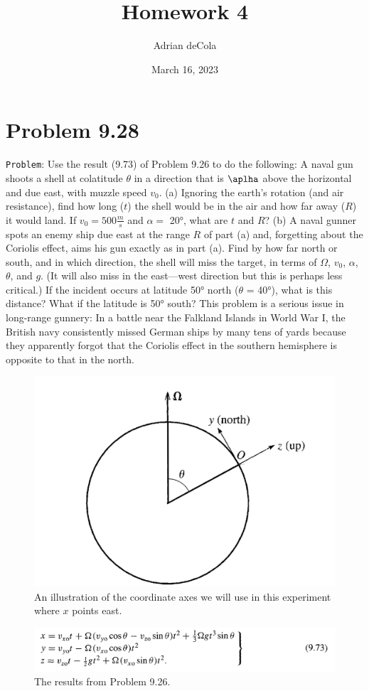 \documentclass{article}
\title{Homework 4}
\author{Adrian deCola}
\date{March 16, 2023}
\begin{document}
\maketitle


\section*{Problem 9.28}
\verb+Problem+: Use the result (9.73) of Problem 9.26 to do the following: A naval gun shoots a shell at colatitude $\theta$ in a direction that is $ \aplha $ above the horizontal and due east, with muzzle speed $v_0$. (a) Ignoring the earth's rotation (and air resistance), find how long ($t$) the shell would be in the air and how far away ($R$) it would land. If $v_0= 500 \frac{m}{s}$ and $\alpha =$ 20°, what are $t$ and $R$? (b) A naval gunner spots an enemy ship due east at the range $R$ of part (a) and, forgetting about the Coriolis effect, aims his gun exactly as in part (a). Find by how far north or south, and in which direction, the shell will miss the target, in terms of $\Omega$, $v_0$, $\alpha$, $\theta$, and $g$. (It will also miss in the east—west direction but this is perhaps less critical.) If the incident occurs at latitude 50° north ($\theta$ = 40°), what is this distance? What if the latitude is 50° south? This problem is a serious issue in long-range gunnery: In a battle near the Falkland Islands in World War I, the British navy consistently missed German ships by many tens of yards because they apparently forgot that the Coriolis effect in the southern hemisphere is opposite to that in the north.


\begin{figure}[!h]
    \centering
    \includegraphics[width=.45\textwidth]{hw4_fig.png}
    \caption{An illustration of the coordinate axes we will use in this experiment where $x$ points east.}
\end{figure}

\begin{figure}[!h]
    \centering
    \includegraphics[width=.7\textwidth]{hw4_fig2.png}
    \caption{The results from Problem 9.26.}
\end{figure}
\end{document}

